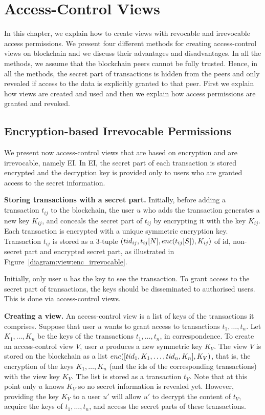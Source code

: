 \section{Access-Control Views}
\label{ch:view:ac_views}

In this chapter, we explain how to create views with revocable and irrevocable access permissions. We present four different methods for creating access-control views on blockchain %
and we discuss their advantages and disadvantages. In all the methods, we assume that the blockchain peers cannot be fully trusted. Hence, in all the methods, the secret part of transactions is hidden from the peers and only revealed if access to the data is explicitly granted to that peer. First we explain how views are created and used and then we explain how access permissions are granted and revoked.


\subsection{Encryption-based Irrevocable  Permissions}
\label{ch:view:ac_views:enc_irrevocable}

We present now access-control views that are based on encryption and are irrevocable, namely EI. In EI, the secret part of each transaction is stored encrypted and the decryption key is provided only to users who are granted access to the secret information. 

\medskip
\noindent
\textbf{Storing transactions with a secret part.}
Initially, before adding a transaction $t_{ij}$ to the blockchain, the user $u$ who adds the transaction generates a new key $K_{ij}$, and conceals the secret part of  $t_{ij}$ by encrypting it with the key  $K_{ij}$. Each transaction is encrypted with a unique symmetric encryption key. Transaction $t_{ij}$ is stored as a 3-tuple $({tid\/}_{ij}, t_{ij}[N], enc\/(t_{ij}[S]), K_{ij})$ of id, non-secret part and encrypted secret part, as illustrated in Figure~\ref{diagram:view:enc_irrevocable}. 

Initially, only user $u$ has the key to see the transaction. To grant access to the secret part of transactions, the keys should be disseminated to authorised users. This is done via access-control views.  

\medskip
\noindent
\textbf{Creating a view.} An access-control view is a list of keys of the transactions it comprises. Suppose that user $u$ wants to grant access to transactions $t_1, \ldots, t_n$. Let $K_1,\ldots,K_n$ be the keys of the transactions $t_1, \ldots, t_n$, in correspondence. To create an access-control view $V$, user $u$ produces a new symmetric key $K_V$. The view $V$ is stored on the blockchain as a list $enc\/([{tid\/}_{1}, K_1,\ldots, {tid\/}_{n}, K_n], K_V)$, that is, the encryption of the keys $K_1,\ldots,K_n$ (and the ids of the corresponding transactions) with the view key $K_V$. The list is stored as a transaction $t_V$. Note that at this point only $u$ knows $K_V$ so no secret information is revealed yet. However, providing the key $K_V$ to a user $u'$ will allow $u'$ to decrypt the content of $t_V$, acquire the keys of  $t_1, \ldots, t_n$, and access the secret parts of these transactions. 

